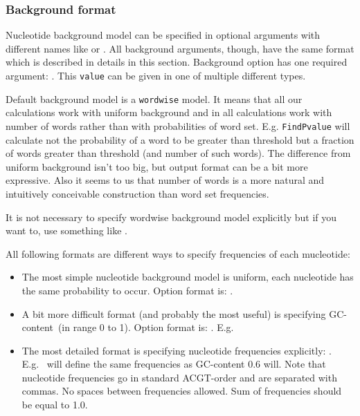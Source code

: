 \subsubsection{Background format}
Nucleotide background model can be specified in optional arguments with different names like  or . All background arguments, though, have the same format which is described in details in this section. Background option has one required argument: . This \texttt{value} can be given in one of multiple different types.

Default background model is a \texttt{wordwise} model. It means that all our calculations work with uniform background and in all calculations work with number of words rather than with probabilities of word set. E.g. \texttt{FindPvalue} will calculate not the probability of a word to be greater than threshold but a fraction of words greater than threshold (and number of such words). The difference from uniform background isn't too big, but output format can be a bit more expressive. Also it seems to us that number of words is a more natural and intuitively conceivable construction than word set frequencies.

It is not necessary to specify wordwise background model explicitly but if you want to, use something like .

All following formats are different ways to specify frequencies of each mucleotide:
\begin{itemize}
\item The most simple nucleotide background model is uniform, each nucleotide has the same probability to occur. Option format is: .
\item A bit more difficult format (and probably the most useful) is specifying GC-content~(in range 0 to 1). Option format is: . E.g.~
\item The most detailed format is specifying nucleotide frequencies explicitly: . E.g.~ will define the same frequencies as GC-content 0.6 will. Note that nucleotide frequencies go in standard ACGT-order and are separated with commas. No spaces between frequencies allowed. Sum of frequencies should be equal to 1.0.
\end{itemize}
